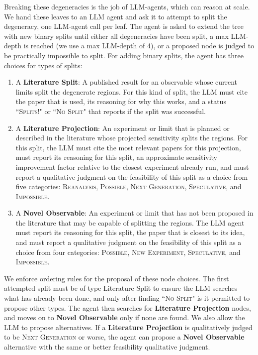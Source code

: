 \documentclass[11pt]{article}
\begin{document}
Breaking these degeneracies is the job of LLM-agents, which can reason at scale.  We hand these leaves to an LLM agent and ask it to attempt to split the degeneracy, one LLM-agent call per leaf. The agent is asked to extend the tree with new binary splits until either all degeneracies have been split, a max LLM-depth is reached (we use a max LLM-depth of 4), or a proposed node is judged to be practically impossible to split. For adding binary splits, the agent has three choices for types of splits:
\begin{enumerate}
    \item A \textbf{Literature Split}: A published result for an observable whose current limits split the degenerate regions. For this kind of split, the LLM must cite the paper that is used, its reasoning for why this works, and a status \textsc{``Splits!"} or \textsc{``No Split"} that reports if the split was successful.
    \item A \textbf{Literature Projection}: An experiment or limit that is planned or described in the literature whose projected sensitivity splits the regions. For this split, the LLM must cite the most relevant papers for this projection, must report its reasoning for this split, an approximate sensitivity improvement factor relative to the closest experiment already run, and must report a qualitative judgment on the feasibility of this split as a choice from five categories: \textsc{Reanalysis}, \textsc{Possible}, \textsc{Next Generation}, \textsc{Speculative}, and \textsc{Impossible}.
    \item A \textbf{Novel Observable}: An experiment or limit that has not been proposed in the literature that may be capable of splitting the regions. The LLM agent must report its reasoning for this split, the paper that is closest to its idea, and must report a qualitative judgment on the feasibility of this split as a choice from four categories: \textsc{Possible}, \textsc{New Experiment}, \textsc{Speculative}, and \textsc{Impossible}.
\end{enumerate}

We enforce ordering rules for the proposal of these node choices. The first attempted split must be of type Literature Split to ensure the LLM searches what has already been done, and only after finding \textsc{``No Split"} is it permitted to propose other types. The agent then searches for \textbf{Literature Projection} nodes, and moves on to \textbf{Novel Observable} only if none are found. We also allow the LLM to propose alternatives. If a \textbf{Literature Projection} is qualitatively judged to be \textsc{Next Generation} or worse, the agent can propose a \textbf{Novel Observable} alternative with the same or better feasibility qualitative judgment.
\end{document}
